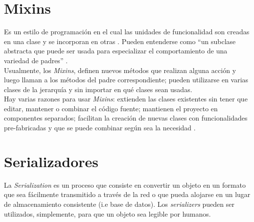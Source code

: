 \section{Mixins}

Es un estilo de programación en el cual las unidades de funcionalidad son creadas en una clase y se incorporan en otras \cite{Mixins}. Pueden entenderse como “un subclase abstracta que puede ser usada para especializar el comportamiento de una variedad de padres” \cite{Mixins2}. \\

Usualmente, los \textit{Mixins}, definen nuevos métodos que realizan alguna acción y luego llaman a los métodos del padre correspondiente; pueden utilizarse en varias clases de la jerarquía y sin importar en qué clases sean usadas. \\

Hay varias razones para usar \textit{Mixins}: extienden las clases existentes sin tener que editar, mantener o combinar el código fuente; mantienen el proyecto en componentes separados; facilitan la creación de nuevas clases con funcionalidades pre-fabricadas y que se puede combinar según sea la necesidad \cite{Mixins}.

\section{Serializadores}

La \textit{Serialization} es un proceso que consiste en convertir un objeto en
un formato que sea fácilmente transmitido a través de la red o que pueda
alojarse en un lugar de almacenamiento consistente (i.e base de datos). Los
\textit{serializers} pueden ser utilizados, simplemente, para que un objeto sea
legible por humanos.
